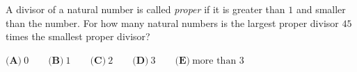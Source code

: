 A divisor of a natural number is called \emph{proper} if it is greater than $1$ and smaller than the number. For how many natural numbers is the largest proper divisor $45$ times the smallest proper divisor?

$\textbf{(A)}\ 0\qquad\textbf{(B)}\ 1\qquad\textbf{(C)}\ 2\qquad\textbf{(D)}\ 3\qquad\textbf{(E)}\ \text{more than }3$
